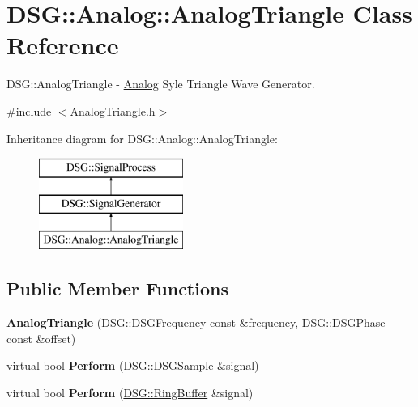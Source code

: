 \hypertarget{class_d_s_g_1_1_analog_1_1_analog_triangle}{\section{D\+S\+G\+:\+:Analog\+:\+:Analog\+Triangle Class Reference}
\label{class_d_s_g_1_1_analog_1_1_analog_triangle}
}


D\+S\+G\+::\+Analog\+Triangle -\/ \hyperlink{namespace_d_s_g_1_1_analog}{Analog} Syle Triangle Wave Generator.  




{\ttfamily \#include $<$Analog\+Triangle.\+h$>$}

Inheritance diagram for D\+S\+G\+:\+:Analog\+:\+:Analog\+Triangle\+:\begin{figure}[H]
\begin{center}
\leavevmode
\includegraphics[height=3.000000cm]{class_d_s_g_1_1_analog_1_1_analog_triangle}
\end{center}
\end{figure}
\subsection*{Public Member Functions}
\begin{DoxyCompactItemize}
\item 
\hypertarget{class_d_s_g_1_1_analog_1_1_analog_triangle_a75c0a8b20e1843b35de3944da11c75ed}{{\bfseries Analog\+Triangle} (D\+S\+G\+::\+D\+S\+G\+Frequency const \&frequency, D\+S\+G\+::\+D\+S\+G\+Phase const \&offset)}\label{class_d_s_g_1_1_analog_1_1_analog_triangle_a75c0a8b20e1843b35de3944da11c75ed}

\item 
\hypertarget{class_d_s_g_1_1_analog_1_1_analog_triangle_a9b2484f3eb4c4ad545cb88b8833be124}{virtual bool {\bfseries Perform} (D\+S\+G\+::\+D\+S\+G\+Sample \&signal)}\label{class_d_s_g_1_1_analog_1_1_analog_triangle_a9b2484f3eb4c4ad545cb88b8833be124}

\item 
\hypertarget{class_d_s_g_1_1_analog_1_1_analog_triangle_a568c994e0f83f6a01d813357259a8f37}{virtual bool {\bfseries Perform} (\hyperlink{class_d_s_g_1_1_ring_buffer}{D\+S\+G\+::\+Ring\+Buffer} \&signal)}\label{class_d_s_g_1_1_analog_1_1_analog_triangle_a568c994e0f83f6a01d813357259a8f37}

\end{DoxyCompactItemize}
